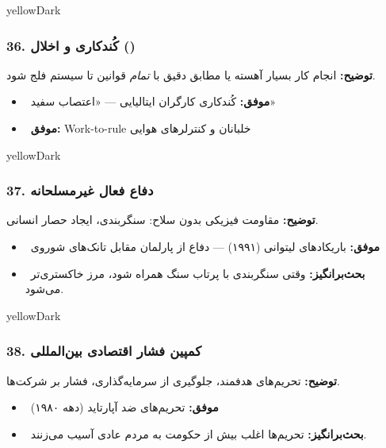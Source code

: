 \documentclass[a4paper,12pt]{article}
\newcommand{\success}[1]{\textcolor{greenPrimary}{\faCheckCircle\ \textbf{موفق:}} #1}
\newcommand{\debate}[1]{\textcolor{orangePrimary}{\faQuestionCircle\ \textbf{بحث‌برانگیز:}} #1}
\newcommand{\methodnum}[1]{\textcolor{purpleLight}{\textbf{#1.}}}
\begin{document}
\begin{methodcard}{yellowDark}
\subsubsection{\methodnum{36} کُندکاری و اخلال ()}
\textbf{توضیح:} انجام کار بسیار آهسته یا مطابق دقیق با \textit{تمام} قوانین تا سیستم فلج شود.

\begin{itemize}[label=\textcolor{greenPrimary}{\faCheckCircle}]
  \item \success{کُندکاری کارگران ایتالیایی — «اعتصاب سفید»}
  \item \success{Work-to-rule خلبانان و کنترلرهای هوایی}
\end{itemize}
\end{methodcard}

\begin{methodcard}{yellowDark}
\subsubsection{\methodnum{37} دفاع فعال غیرمسلحانه}
\textbf{توضیح:} مقاومت فیزیکی بدون سلاح: سنگربندی، ایجاد حصار انسانی.

\begin{itemize}[label=\textcolor{greenPrimary}{\faCheckCircle}]
  \item \success{باریکادهای لیتوانی (۱۹۹۱) — دفاع از پارلمان مقابل تانک‌های شوروی}
\end{itemize}
\begin{itemize}[label=\textcolor{yellowPrimary}{\faExclamationTriangle}]
  \item \debate{وقتی سنگربندی با پرتاب سنگ همراه شود، مرز خاکستری‌تر می‌شود.}
\end{itemize}
\end{methodcard}

\begin{methodcard}{yellowDark}
\subsubsection{\methodnum{38} کمپین فشار اقتصادی بین‌المللی}
\textbf{توضیح:} تحریم‌های هدفمند، جلوگیری از سرمایه‌گذاری، فشار بر شرکت‌ها.

\begin{itemize}[label=\textcolor{greenPrimary}{\faCheckCircle}]
  \item \success{تحریم‌های ضد آپارتاید (دهه ۱۹۸۰)}
\end{itemize}
\begin{itemize}[label=\textcolor{yellowPrimary}{\faExclamationTriangle}]
  \item \debate{تحریم‌ها اغلب بیش از حکومت به مردم عادی آسیب می‌زنند.}
\end{itemize}
\end{methodcard}
\end{document}
